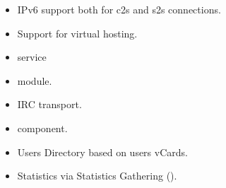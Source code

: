 \begin{itemize}
\begin{itemize}
\item IPv6 support both for c2s and s2s connections. 
\item Support for virtual hosting. \improved{}
\item {} service
\item {} module.
\item IRC transport.
\item {} component.
\item Users Directory based on users vCards.
\item Statistics via Statistics Gathering ().
\end{itemize}
\end{itemize}